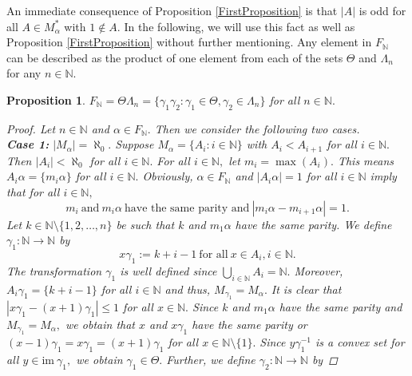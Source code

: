 \documentclass[11pt]{article}
\theoremstyle{plain}
\newtheorem{proposition}[theorem]{Proposition}
\theoremstyle{definition}
\newcommand{\im}{\mathrm{im~}}
\begin{document}
An immediate consequence of Proposition \ref{FirstProposition} is that $\left\vert A\right\vert$ is odd for all $A\in M_{\alpha}^{*}$ with $1\not\in A.$ In the following, we will use this fact as well as Proposition \ref{FirstProposition} without further mentioning. Any element in $F_{\mathbb{N}}$ can be described as the product of one element from each of the sets $\Theta$ and $\Lambda_{n}$ for any $n\in\mathbb{N}.$
\begin{proposition}\label{Proposition4}
$F_{\mathbb{N}}=\Theta\Lambda_{n}=\{\gamma_{1}\gamma_{2}:\gamma_{1}\in\Theta,\gamma_{2}\in\Lambda_{n}\}$ for all $n\in\mathbb{N}.$
\begin{proof}
Let $n\in\mathbb{N}$ and $\alpha\in F_{\mathbb{N}}.$ Then we consider the following two cases.\\
\textbf{Case 1:} $\left\vert M_{\alpha}\right\vert=\aleph_{0}.$ Suppose $M_{\alpha}=\{A_{i}:i\in\mathbb{N}\}$ with $A_{i}<A_{i+1}$ for all $i\in\mathbb{N}.$ Then $\left\vert A_{i}\right\vert<\aleph_{0}$ for all $i\in\mathbb{N}.$ For all $i\in\mathbb{N},$ let $m_{i}=\max(A_{i}).$ This means $A_{i}\alpha=\{m_{i}\alpha\}$ for all $i\in\mathbb{N}.$ Obviously, $\alpha\in F_{\mathbb{N}}$ and $\left\vert A_{i}\alpha\right\vert=1$ for all $i\in\mathbb{N}$ imply that for all $i\in\mathbb{N},$
\begin{equation}\label{equation1}
m_{i}~\text{and}~m_{i}\alpha~\text{have the same parity and}~\left\vert m_{i}\alpha-m_{i+1}\alpha\right\vert=1.
\end{equation}  
Let $k\in\mathbb{N}\setminus\{1,2,\ldots,n\}$ be such that $k$ and $m_{1}\alpha$ have the same parity. We define $\gamma_{1}:\mathbb{N}\to\mathbb{N}$ by
$$x\gamma_{1}:=k+i-1~\text{for all}~x\in A_{i}, i\in\mathbb{N}.$$
The transformation $\gamma_{1}$ is well defined since $\bigcup_{i\in\mathbb{N}}A_{i}=\mathbb{N}.$ Moreover, $A_{i}\gamma_{1}=\{k+i-1\}$ for all $i\in\mathbb{N}$ and thus, $M_{\gamma_{1}}=M_{\alpha}.$ It is clear that $\left\vert x\gamma_{1}-(x+1)\gamma_{1}\right\vert\leq 1$ for all $x\in\mathbb{N}.$ Since $k$ and $m_{1}\alpha$ have the same parity and $M_{\gamma_{1}}=M_{\alpha},$ we obtain that $x$ and $x\gamma_{1}$ have the same parity or $(x-1)\gamma_{1}=x\gamma_{1}=(x+1)\gamma_{1}$ for all $x\in\mathbb{N}\setminus\{1\}.$ Since $y\gamma_{1}^{-1}$ is a convex set for all $y\in\im\gamma_{1},$ we obtain $\gamma_{1}\in\Theta.$ Further, we define $\gamma_{2}:\mathbb{N}\to\mathbb{N}$ by

\end{proof}
\end{proposition}
\end{document}
